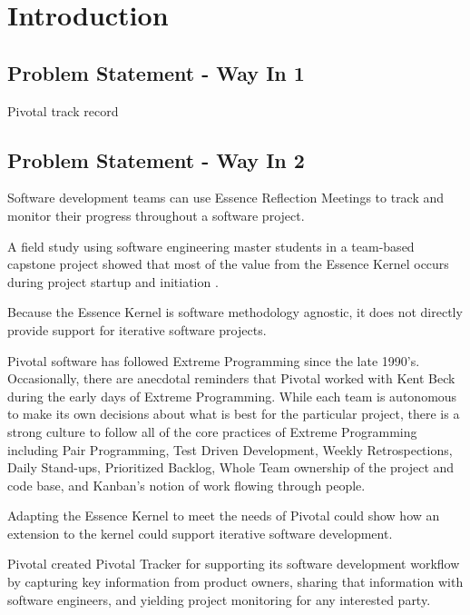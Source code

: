 \documentclass[preprint,12pt,3p]{elsarticle}
\begin{document}

\section{Introduction}

\subsection{Problem Statement - Way In 1}

Pivotal track record



\subsection{Problem Statement - Way In 2}
Software development teams can use Essence Reflection Meetings \cite{EASE2014} to track and monitor their progress throughout a software project. 

A field study using software engineering master students in a team-based capstone project showed that most of the value from the Essence Kernel occurs during project startup and initiation \cite{ICSE2014}.

Because the Essence Kernel is software methodology agnostic, it does not directly provide support for iterative software projects. \cite{ICSE2014}

Pivotal software has followed Extreme Programming since the late 1990's. Occasionally, there are anecdotal reminders that Pivotal worked with Kent Beck during the early days of Extreme Programming. While each team is autonomous to make its own decisions about what is best for the particular project, there is a strong culture to follow all of the core practices of Extreme Programming including Pair Programming, Test Driven Development, Weekly Retrospections, Daily Stand-ups, Prioritized Backlog, Whole Team ownership of the project and code base, and Kanban's notion of work flowing through people. 

Adapting the Essence Kernel to meet the needs of Pivotal could show how an extension to the kernel could support iterative software development.

Pivotal created Pivotal Tracker for supporting its software development workflow by capturing key information from product owners, sharing that information with software engineers, and yielding project monitoring for any interested party.
\end{document}

